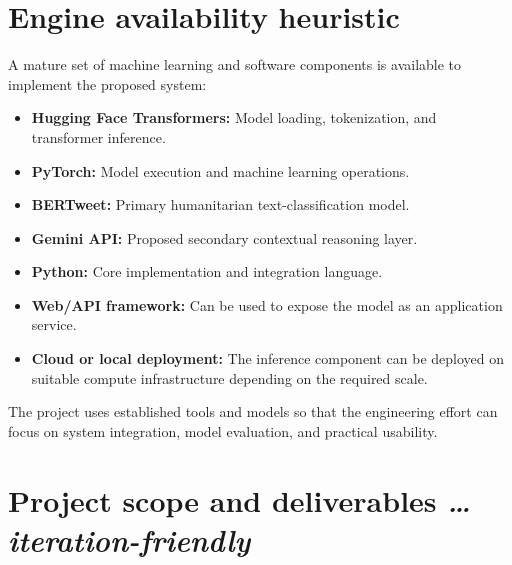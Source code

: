 \documentclass[11pt,a4paper]{article}
\newcommand{\BvrHint}[1]{%
  {\normalfont\normalsize\itshape\hfill #1}}
\begin{document}

\section{Engine availability heuristic}

A mature set of machine learning and software components is available to
implement the proposed system:

\begin{itemize}[leftmargin=0.7cm]

    \item \textbf{Hugging Face Transformers:} Model loading, tokenization,
    and transformer inference.

    \item \textbf{PyTorch:} Model execution and machine learning operations.

    \item \textbf{BERTweet:} Primary humanitarian text-classification model.

    \item \textbf{Gemini API:} Proposed secondary contextual reasoning layer.

    \item \textbf{Python:} Core implementation and integration language.

    \item \textbf{Web/API framework:} Can be used to expose the model as an
    application service.

    \item \textbf{Cloud or local deployment:} The inference component can be
    deployed on suitable compute infrastructure depending on the required
    scale.

\end{itemize}

The project uses established tools and models so that the engineering effort
can focus on system integration, model evaluation, and practical usability.


\section{Project scope and deliverables %
\BvrHint{\ldots iteration-friendly}}
\end{document}
